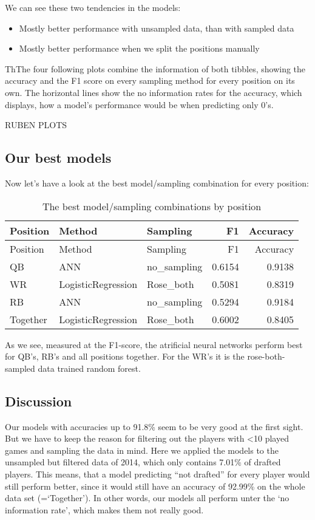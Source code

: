\documentclass[]{article}
\providecommand{\tightlist}{%
  \setlength{\itemsep}{0pt}\setlength{\parskip}{0pt}}
\begin{document}
We can see these two tendencies in the models:

\begin{itemize}
\tightlist
\item
  Mostly better performance with unsampled data, than with sampled data
\item
  Mostly better performance when we split the positions manually
\end{itemize}

ThThe four following plots combine the information of both tibbles,
showing the accuracy and the F1 score on every sampling method for every
position on its own. The horizontal lines show the no information rates
for the accuracy, which displays, how a model's performance would be
when predicting only 0's.

RUBEN PLOTS

\hypertarget{our-best-models}{%
\subsection{Our best models}\label{our-best-models}}

Now let's have a look at the best model/sampling combination for every
position:

\begin{longtable}[]{@{}lllrr@{}}
\caption{The best model/sampling combinations by
position}\tabularnewline
\toprule
Position & Method & Sampling & F1 & Accuracy\tabularnewline
\midrule
\endfirsthead
\toprule
Position & Method & Sampling & F1 & Accuracy\tabularnewline
\midrule
\endhead
QB & ANN & no\_sampling & 0.6154 & 0.9138\tabularnewline
WR & LogisticRegression & Rose\_both & 0.5081 & 0.8319\tabularnewline
RB & ANN & no\_sampling & 0.5294 & 0.9184\tabularnewline
Together & LogisticRegression & Rose\_both & 0.6002 &
0.8405\tabularnewline
\bottomrule
\end{longtable}

As we see, measured at the F1-score, the atrificial neural networks
perform best for QB's, RB's and all positions together. For the WR's it
is the rose-both-sampled data trained random forest.

\hypertarget{discussion}{%
\subsection{Discussion}\label{discussion}}

Our models with accuracies up to 91.8\% seem to be very good at the
first sight. But we have to keep the reason for filtering out the
players with \textless10 played games and sampling the data in mind.
Here we applied the models to the unsampled but filtered data of 2014,
which only contains 7.01\% of drafted players. This means, that a model
predicting ``not drafted'' for every player would still perform better,
since it would still have an accuracy of 92.99\% on the whole data set
(=`Together'). In other words, our models all perform unter the `no
information rate', which makes them not really good.
\end{document}
